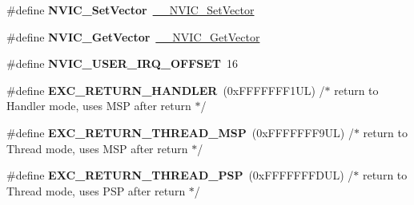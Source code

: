 \begin{DoxyCompactItemize}
\item 
\mbox{\label{group___c_m_s_i_s___core___n_v_i_c_functions_ga804af63bb4c4c317387897431814775d}} 
\#define {\bfseries N\+V\+I\+C\+\_\+\+Set\+Vector}~\hyperlink{group___c_m_s_i_s___core___n_v_i_c_functions_ga0df355460bc1783d58f9d72ee4884208}{\+\_\+\+\_\+\+N\+V\+I\+C\+\_\+\+Set\+Vector}
\item 
\mbox{\label{group___c_m_s_i_s___core___n_v_i_c_functions_ga955eb1c33a3dcc62af11a8385e8c0fc8}} 
\#define {\bfseries N\+V\+I\+C\+\_\+\+Get\+Vector}~\hyperlink{group___c_m_s_i_s___core___n_v_i_c_functions_ga44b665d2afb708121d9b10c76ff00ee5}{\+\_\+\+\_\+\+N\+V\+I\+C\+\_\+\+Get\+Vector}
\item 
\mbox{\label{group___c_m_s_i_s___core___n_v_i_c_functions_ga8045d905a5ca57437d8e6f71ffcb6df5}} 
\#define {\bfseries N\+V\+I\+C\+\_\+\+U\+S\+E\+R\+\_\+\+I\+R\+Q\+\_\+\+O\+F\+F\+S\+ET}~16
\item 
\mbox{\label{group___c_m_s_i_s___core___n_v_i_c_functions_gaa6fa2b10f756385433e08522d9e4632f}} 
\#define {\bfseries E\+X\+C\+\_\+\+R\+E\+T\+U\+R\+N\+\_\+\+H\+A\+N\+D\+L\+ER}~(0x\+F\+F\+F\+F\+F\+F\+F1\+U\+L)     /$\ast$ return to Handler mode, uses M\+S\+P after return                               $\ast$/
\item 
\mbox{\label{group___c_m_s_i_s___core___n_v_i_c_functions_gaea4703101b5e679f695e231f7ee72331}} 
\#define {\bfseries E\+X\+C\+\_\+\+R\+E\+T\+U\+R\+N\+\_\+\+T\+H\+R\+E\+A\+D\+\_\+\+M\+SP}~(0x\+F\+F\+F\+F\+F\+F\+F9\+U\+L)     /$\ast$ return to Thread mode, uses M\+S\+P after return                                $\ast$/
\item 
\mbox{\label{group___c_m_s_i_s___core___n_v_i_c_functions_ga9998daf0fbdf31dbc8f81cd604b58175}} 
\#define {\bfseries E\+X\+C\+\_\+\+R\+E\+T\+U\+R\+N\+\_\+\+T\+H\+R\+E\+A\+D\+\_\+\+P\+SP}~(0x\+F\+F\+F\+F\+F\+F\+F\+D\+U\+L)     /$\ast$ return to Thread mode, uses P\+S\+P after return                                $\ast$/
\item 
\mbox{\label{group___c_m_s_i_s___core___n_v_i_c_functions_ga53c75b28823441c6153269f0ecbed878}} 

\end{DoxyCompactItemize}
